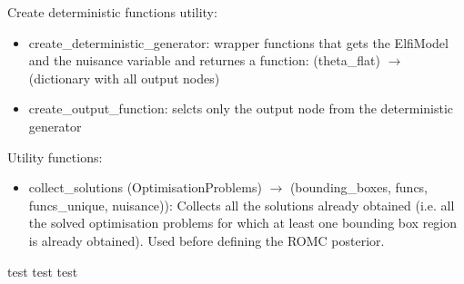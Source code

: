 \documentclass{article}
\begin{document}
  Create deterministic functions utility:

  \begin{itemize}
    \item create\_deterministic\_generator: wrapper functions that gets the ElfiModel and the nuisance variable and returnes a function: (theta\_flat) $\rightarrow$ (dictionary with all output nodes)
    \item create\_output\_function: selcts only the output node from the deterministic generator      \end{itemize}
  

  Utility functions:

  \begin{itemize}
    \item collect\_solutions (OptimisationProblems) $\rightarrow$ (bounding\_boxes, funcs, funcs\_unique, nuisance)): Collects all the solutions already obtained (i.e. all the solved optimisation problems for which at least one bounding box region is already obtained). Used before defining the ROMC posterior.
    \end{itemize}

    test test test
\end{document}
